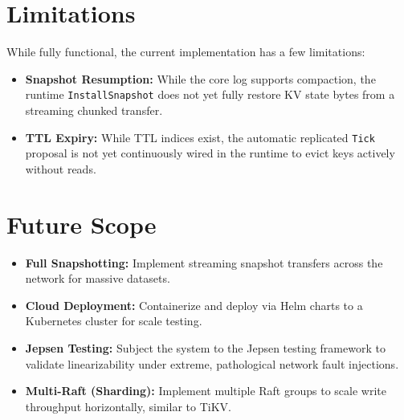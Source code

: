 \documentclass[12pt,a4paper]{report}
\begin{document}
\section{Limitations}
While fully functional, the current implementation has a few limitations:
\begin{itemize}
    \item \textbf{Snapshot Resumption:} While the core log supports compaction, the runtime \texttt{InstallSnapshot} does not yet fully restore KV state bytes from a streaming chunked transfer.
    \item \textbf{TTL Expiry:} While TTL indices exist, the automatic replicated \texttt{Tick} proposal is not yet continuously wired in the runtime to evict keys actively without reads.
\end{itemize}

\section{Future Scope}
\begin{itemize}
    \item \textbf{Full Snapshotting:} Implement streaming snapshot transfers across the network for massive datasets.
    \item \textbf{Cloud Deployment:} Containerize and deploy via Helm charts to a Kubernetes cluster for scale testing.
    \item \textbf{Jepsen Testing:} Subject the system to the Jepsen testing framework to validate linearizability under extreme, pathological network fault injections.
    \item \textbf{Multi-Raft (Sharding):} Implement multiple Raft groups to scale write throughput horizontally, similar to TiKV.
\end{itemize}
\end{document}
